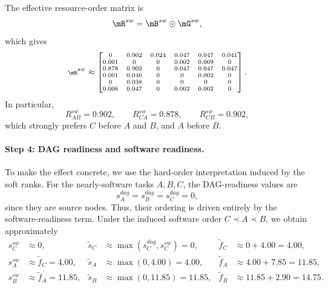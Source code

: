 The effective resource-order matrix is
\begin{equation}
\mR^{sw}=\mB^{sw}\odot \mG^{sw},
\end{equation}
which gives
\begingroup
\setlength{\arraycolsep}{3pt}
\begin{equation}
\scriptsize
\mR^{sw}\approx
\begin{bmatrix}
0     & 0.902 & 0.024 & 0.047 & 0.047 & 0.041\\
0.001 & 0     & 0     & 0.002 & 0.009 & 0    \\
0.878 & 0.902 & 0     & 0.047 & 0.047 & 0.047\\
0.001 & 0.046 & 0     & 0     & 0.002 & 0    \\
0     & 0.038 & 0     & 0     & 0     & 0    \\
0.006 & 0.047 & 0     & 0.002 & 0.002 & 0
\end{bmatrix}.
\end{equation}
\endgroup
In particular,
\[
R^{sw}_{AB}=0.902,\qquad
R^{sw}_{CA}=0.878,\qquad
R^{sw}_{CB}=0.902,
\]
which strongly prefers \(C\) before \(A\) and \(B\), and \(A\) before \(B\).

\paragraph{\textbf{Step 4: DAG readiness and software readiness.}}
To make the effect concrete, we use the hard-order interpretation induced by the soft ranks. For the nearly-software tasks \(A,B,C\), the DAG-readiness values are
\[
s_A^{dag}=s_B^{dag}=s_C^{dag}=0,
\]
since they are source nodes. Thus, their ordering is driven entirely by the software-readiness term. Under the induced software order \(C\prec A\prec B\), we obtain approximately
\begin{align}
s_C^{sw} &\approx 0, &
\tilde s_C &\approx \max(s_C^{dag},s_C^{sw}) = 0, &
\tilde f_C &\approx 0 + 4.00 = 4.00,\\
s_A^{sw} &\approx \tilde f_C = 4.00, &
\tilde s_A &\approx \max(0,4.00) = 4.00, &
\tilde f_A &\approx 4.00 + 7.85 = 11.85,\\
s_B^{sw} &\approx \tilde f_A = 11.85, &
\tilde s_B &\approx \max(0,11.85) = 11.85, &
\tilde f_B &\approx 11.85 + 2.90 = 14.75.
\end{align}

